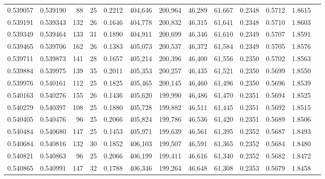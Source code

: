 \begin{tabular}{rrrrrrrrrrrrr}
0.539057 & 0.539190 &    88 &  25 &                                     0.2212 & 404,646 & 200,964 &  46,289 &  61,667 & 0.2348 & 0.5712 & 1.8615 \\
0.539191 & 0.539343 &   132 &  26 &                                     0.1646 & 404,778 & 200,832 &  46,315 &  61,641 & 0.2348 & 0.5710 & 1.8603 \\
0.539349 & 0.539464 &   133 &  31 &                                     0.1890 & 404,911 & 200,699 &  46,346 &  61,610 & 0.2349 & 0.5707 & 1.8591 \\
0.539465 & 0.539706 &   162 &  26 &                                     0.1383 & 405,073 & 200,537 &  46,372 &  61,584 & 0.2349 & 0.5705 & 1.8576 \\
0.539711 & 0.539873 &   141 &  28 &                                     0.1657 & 405,214 & 200,396 &  46,400 &  61,556 & 0.2350 & 0.5702 & 1.8563 \\
0.539884 & 0.539975 &   139 &  35 &                                     0.2011 & 405,353 & 200,257 &  46,435 &  61,521 & 0.2350 & 0.5699 & 1.8550 \\
0.539976 & 0.540161 &   112 &  25 &                                     0.1825 & 405,465 & 200,145 &  46,460 &  61,496 & 0.2350 & 0.5696 & 1.8539 \\
0.540163 & 0.540276 &   155 &  26 &                                     0.1436 & 405,620 & 199,990 &  46,486 &  61,470 & 0.2351 & 0.5694 & 1.8525 \\
0.540279 & 0.540397 &   108 &  25 &                                     0.1880 & 405,728 & 199,882 &  46,511 &  61,445 & 0.2351 & 0.5692 & 1.8515 \\
0.540405 & 0.540476 &    96 &  25 &                                     0.2066 & 405,824 & 199,786 &  46,536 &  61,420 & 0.2351 & 0.5689 & 1.8506 \\
0.540484 & 0.540680 &   147 &  25 &                                     0.1453 & 405,971 & 199,639 &  46,561 &  61,395 & 0.2352 & 0.5687 & 1.8493 \\
0.540684 & 0.540816 &   132 &  30 &                                     0.1852 & 406,103 & 199,507 &  46,591 &  61,365 & 0.2352 & 0.5684 & 1.8480 \\
0.540821 & 0.540863 &    96 &  25 &                                     0.2066 & 406,199 & 199,411 &  46,616 &  61,340 & 0.2352 & 0.5682 & 1.8472 \\
0.540865 & 0.540991 &   147 &  32 &                                     0.1788 & 406,346 & 199,264 &  46,648 &  61,308 & 0.2353 & 0.5679 & 1.8458 \\

\end{tabular}
